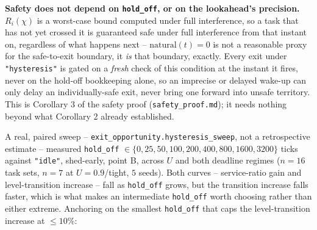 \textbf{Safety does not depend on \texttt{hold\_off}, or on the lookahead's
precision.} $R_i(\chi)$ is a worst-case bound computed under full
interference, so a task that has not yet crossed it is guaranteed safe under
full interference from that instant on, regardless of what happens next --
$\mathrm{natural}(t) = 0$ is not a reasonable proxy for the safe-to-exit
boundary, it \emph{is} that boundary, exactly. Every exit under
\texttt{"hysteresis"} is gated on a \emph{fresh} check of this condition at
the instant it fires, never on the hold-off bookkeeping alone, so an
imprecise or delayed wake-up can only delay an individually-safe exit, never
bring one forward into unsafe territory. This is Corollary 3 of the safety
proof (\texttt{safety\_proof.md}); it needs nothing beyond what Corollary 2
already established.

A real, paired sweep -- \texttt{exit\_opportunity.hysteresis\_sweep}, not a
retrospective estimate -- measured \texttt{hold\_off} $\in \{0, 25, 50, 100,
200, 400, 800, 1600, 3200\}$ ticks against \texttt{"idle"}, shed-early, point
B, across $U$ and both deadline regimes ($n=16$ task sets, $n=7$ at
$U=0.9$/tight, $5$ seeds). Both curves -- service-ratio gain and
level-transition increase -- fall as \texttt{hold\_off} grows, but the
transition increase falls faster, which is what makes an intermediate
\texttt{hold\_off} worth choosing rather than either extreme. Anchoring on the
smallest \texttt{hold\_off} that caps the level-transition increase at
$\leq 10\%$:

